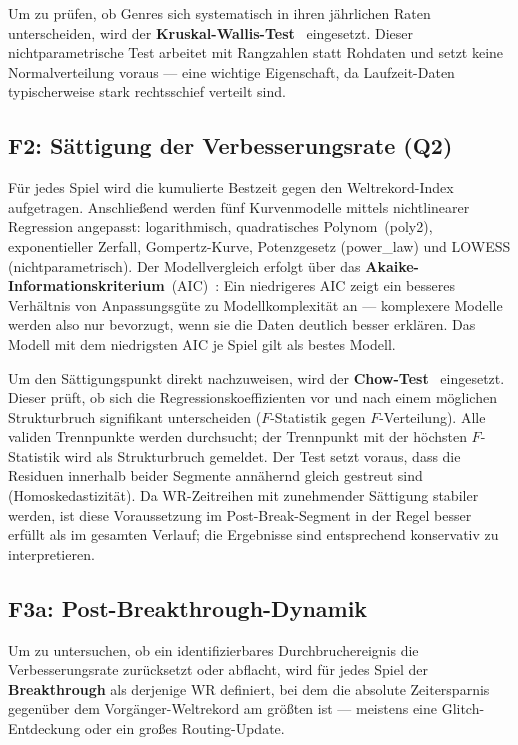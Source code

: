 Um zu prüfen, ob Genres sich systematisch in ihren jährlichen Raten unterscheiden, wird der \textbf{Kruskal-Wallis-Test}~\cite{kim2016} eingesetzt. Dieser nichtparametrische Test arbeitet mit Rangzahlen statt Rohdaten und setzt keine Normalverteilung voraus --- eine wichtige Eigenschaft, da Laufzeit-Daten typischerweise stark rechtsschief verteilt sind.

\subsection*{F2: Sättigung der Verbesserungsrate (Q2)}

Für jedes Spiel wird die kumulierte Bestzeit gegen den Weltrekord-Index aufgetragen. Anschließend werden fünf Kurvenmodelle mittels nichtlinearer Regression angepasst: logarithmisch, quadratisches Polynom~(poly2), exponentieller Zerfall, Gompertz-Kurve, Potenzgesetz (power\_law) und LOWESS (nichtparametrisch). Der Modellvergleich erfolgt über das \textbf{Akaike-Informationskriterium}~(AIC)~\cite{ding2018}: Ein niedrigeres AIC zeigt ein besseres Verhältnis von Anpassungsgüte zu Modellkomplexität an — komplexere Modelle werden also nur bevorzugt, wenn sie die Daten deutlich besser erklären. Das Modell mit dem niedrigsten AIC je Spiel gilt als bestes Modell.

Um den Sättigungspunkt direkt nachzuweisen, wird der \textbf{Chow-Test}~\cite{zeileis2002} eingesetzt. Dieser prüft, ob sich die Regressionskoeffizienten vor und nach einem möglichen Strukturbruch signifikant unterscheiden ($F$-Statistik gegen $F$-Verteilung). Alle validen Trennpunkte werden durchsucht; der Trennpunkt mit der höchsten $F$-Statistik wird als Strukturbruch gemeldet. Der Test setzt voraus, dass die Residuen innerhalb beider Segmente annähernd gleich gestreut sind (Homoskedastizität). Da WR-Zeitreihen mit zunehmender Sättigung stabiler werden, ist diese Voraussetzung im Post-Break-Segment in der Regel besser erfüllt als im gesamten Verlauf; die Ergebnisse sind entsprechend konservativ zu interpretieren.

\subsection*{F3a: Post-Breakthrough-Dynamik}

Um zu untersuchen, ob ein identifizierbares Durchbruchereignis die Verbesserungsrate zurücksetzt oder abflacht, wird für jedes Spiel der \textbf{Breakthrough} als derjenige WR definiert, bei dem die absolute Zeitersparnis gegenüber dem Vorgänger-Weltrekord am größten ist --- meistens eine Glitch-Entdeckung oder ein großes Routing-Update.

